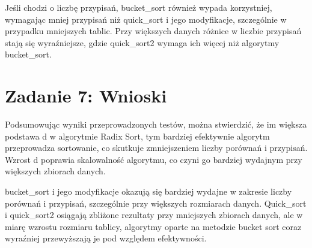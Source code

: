 \documentclass{article}
\theoremstyle{definition}
\begin{document}
		Jeśli chodzi o liczbę przypisań, bucket\_sort również wypada korzystniej, wymagając mniej przypisań niż quick\_sort i jego modyfikacje, szczególnie w przypadku mniejszych tablic. Przy większych danych różnice w liczbie przypisań stają się wyraźniejsze, gdzie quick\_sort2 wymaga ich więcej niż algorytmy bucket\_sort.
		
	\section{Zadanie 7: Wnioski}
		Podsumowując wyniki przeprowadzonych testów, można stwierdzić, że im większa podstawa d w algorytmie Radix Sort, tym bardziej efektywnie algorytm przeprowadza sortowanie, co skutkuje zmniejszeniem liczby porównań i przypisań. Wzrost d poprawia skalowalność algorytmu, co czyni go bardziej wydajnym przy większych zbiorach danych.
		
		bucket\_sort i jego modyfikacje okazują się bardziej wydajne w zakresie liczby porównań i przypisań, szczególnie przy większych rozmiarach danych. Quick\_sort i quick\_sort2 osiągają zbliżone rezultaty przy mniejszych zbiorach danych, ale w miarę wzrostu rozmiaru tablicy, algorytmy oparte na metodzie bucket sort coraz wyraźniej przewyższają je pod względem efektywności.
\end{document}
